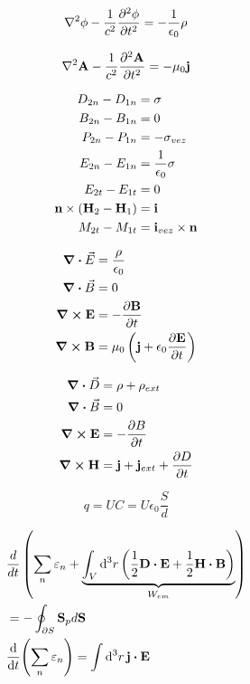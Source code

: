 \documentclass[11pt,twoside]{article}
\begin{document}
\begin{multicols}{3}
\begin{footnotesize}
\begin{equation}
\laplacian \phi - \frac{1}{c^2} \frac{\partial^2 \phi}{\partial t^2} = -\frac{1}{\epsilon_0}\rho
\end{equation}

\begin{equation}
\laplacian \vb{A} - \frac{1}{c^2} \frac{\partial^2 \vb{A}}{\partial t^2} = -\mu_0 \vb{j}
\end{equation}

\begin{equation}
\begin{split}
D_{2n} - D_{1n} &= \sigma \\
B_{2n} - B_{1n} &= 0 \\
P_{2n} - P_{1n} &= -\sigma_{vez} \\
E_{2n} - E_{1n} &= \frac{1}{\epsilon_0} \sigma \\
E_{2t} - E_{1t} &= 0 \\
\vb{n}\times (\vb{H}_2 - \vb{H}_1) &= \vb{i} \\
M_{2t} - M_{1t} &= \vb{i}_{vez} \times \vb{n}
\end{split}
\end{equation}

\begin{equation}
\begin{split}
\div\vec{E} &= \frac{\rho}{\epsilon_0} \\
\div\vec{B} &= 0 \\
\curl \vb{E} &= -\frac{\partial\vb{B}}{\partial t} \\
\curl \vb{B} &= \mu_0 \left( \vb{j} + \epsilon_0 \frac{\partial\vb{E}}{\partial t} \right)
\end{split}
\end{equation}

\begin{equation}
\begin{split}
\div\vec{D} &= \rho + \rho_{ext} \\
\div\vec{B} &= 0 \\
\curl \vb{E} &= - \frac{\partial B}{\partial t} \\
\curl \vb{H} &= \vb{j} + \vb{j}_{ext} + \frac{\partial D}{\partial t}
\end{split}
\end{equation}

\begin{equation}
q = U C = U \epsilon_0 \frac{S}{d}
\end{equation}

\begin{equation}
\begin{split}
&\frac{d}{dt} \left( \sum_n \varepsilon_n + \underbrace{\int_V \dd[3]{r} \left( \frac{1}{2} \vb{D}\vdot\vb{E} + \frac{1}{2}\vb{H}\vdot\vb{B} \right)}_{W_{em}} \right) \\ &= -\oint_{\partial S} \vb{S}_p d\vb{S} \\
&\dv{t} (\sum_n \varepsilon_n ) = \int \dd[3]{r}\vb{j}\vdot\vb{E}
\end{split}
\end{equation}


\end{footnotesize}
\end{multicols}
\end{document}
